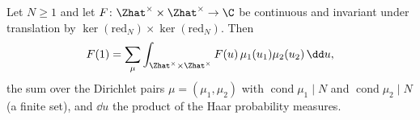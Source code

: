 Let $N\ge1$ and let $F\colon\Zhat^\times\times\Zhat^\times\to\C$ be continuous and invariant under translation by $\ker(\mathrm{red}_N)\times\ker(\mathrm{red}_N)$. Then
\[
  F(1)=\sum_{\mu}\int_{\Zhat^\times\times\Zhat^\times}F(u)\,\mu_1(u_1)\mu_2(u_2)\,\dd u,
\]
the sum over the Dirichlet pairs $\mu=(\mu_1,\mu_2)$ with $\operatorname{cond}\mu_1\mid N$ and $\operatorname{cond}\mu_2\mid N$ (a finite set), and $\dd u$ the product of the Haar probability measures.
